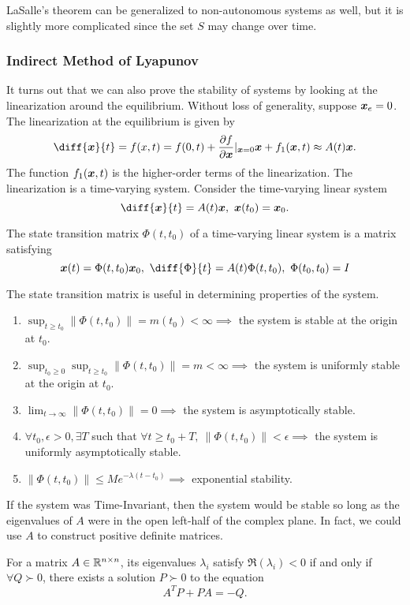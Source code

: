 LaSalle's theorem can be generalized to non-autonomous systems as well, but it
is slightly more complicated since the set $S$ may change over time.

\subsubsection{Indirect Method of Lyapunov}
It turns out that we can also prove the stability of systems by looking at the
linearization around the equilibrium. Without loss of generality, suppose
$\boldsymbol{x}_e = 0$. The linearization at the equilibrium is given by \[
	\diff{\bs{x}}{t} = f(x,t) = f(0, t) + \frac{\partial f}{\partial
	\bs{x}}|_{\bs{x} = 0}\bs{x} + f_1(\bs{x},t) \approx A(t)\bs{x}.
\]
The function $f_1(\boldsymbol{x}, t)$ is the higher-order terms of the linearization.
The linearization is a time-varying system.
Consider the time-varying linear system
\[
	\diff{\bs{x}}{t} = A(t)\bs{x},\ \bs{x}(t_0) = \bs{x}_0.
\]
\begin{definition}
	The state transition matrix $\Phi(t, t_0)$ of a time-varying linear system is
	a matrix satisfying \[
		\bs{x}(t) = \Phi(t, t_0)\bs{x}_0,\ \diff{\Phi}{t} = A(t)\Phi(t, t_0),\
		\Phi(t_0, t_0) = I
	\]
	\label{defn:state-transition-matrix}
\end{definition}
The state transition matrix is useful in determining properties of the system.
\begin{enumerate}
	\item $\sup_{t\geq t_0} \|\Phi(t, t_0)\| = m(t_0) < \infty \implies$ the system
		is stable at the origin at $t_0$.
	\item $\sup_{t_0\geq 0}\sup_{t\geq t_0} \|\Phi(t, t_0)\| = m < \infty \implies$ the system
		is uniformly stable at the origin at $t_0$.
	\item $\lim_{t\to\infty}\|\Phi(t, t_0)\| = 0 \implies$ the system is
		asymptotically stable.
	\item $\forall t_0,\epsilon>0,\exists T$ such that $\forall t\geq t_0 + T,\ \|\Phi(t, t_0)\| <
		\epsilon \implies$ the system is uniformly asymptotically stable.
	\item $\|\Phi(t, t_0)\| \leq Me^{-\lambda(t-t_0)} \implies$ exponential
		stability.
\end{enumerate}
If the system was Time-Invariant, then the system would be stable so long as the
eigenvalues of $A$ were in the open left-half of the complex plane. In fact, we
could use $A$ to construct positive definite matrices.
\begin{theorem}
	For a matrix $A\in \mathbb{R}^{n\times n}$, its eigenvalues $\lambda_i$ satisfy
	$\Re(\lambda_i) < 0$ if and only if $\forall Q \succ 0$, there exists
	a solution $P\succ 0$ to the equation \[
		A^TP + PA = -Q.
	\]
	\label{thm:lyapunov-lemma}
\end{theorem}
